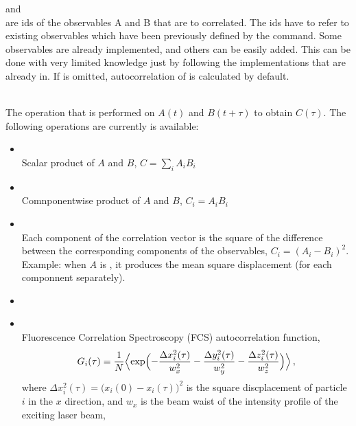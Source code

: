 \begin{arguments}
\item {} and  \\ 
  are ids of the observables A and B that are to correlated. The ids have to refer to existing 
  observables which have been previously defined by the  command.
  Some observables are already implemented, and others can be easily added. This can be done
  with very limited \es{} knowledge just by following the implementations that are already
  in. If  is omitted, autocorrelation of  is calculated by default.
\item {} \\
  The operation that is performed on $A(t)$ and $B(t+\tau)$ to obtain $C(\tau)$. 
  The following operations are currently is available:
  \begin{itemize}
    \item {} \\
    Scalar product of $A$ and $B$, \ie $C=\sum\limits_{i} A_i B_i$
    \item {} \\
    Comnponentwise product of $A$ and $B$, \ie $C_i = A_i B_i$
    \item {} \\
    Each component of the correlation vector is the square of the difference between the 
    corresponding components of the observables, \ie $C_i = (A_i-B_i)^2$. 
    Example: when $A$ is , it produces the mean square displacement
    (for each componnent separately).
    \item {}
    \item {}   \\
    Fluorescence Correlation Spectroscopy (FCS) autocorrelation function, \ie
    \begin{equation}
    G_i(\tau) = \frac{1}{N} \Bigl< \exp \Bigl( - \frac{\Delta x_i^2(\tau) }{w_x^2} - \frac{\Delta y_i^2(\tau)}{w_y^2} - \frac{\Delta z_i^2(\tau)}{w_z^2} \Bigr) \Bigr>\,,
    \label{eq:Gtau}
    \end{equation}
    where $\Delta x_i^2(\tau) = \bigl(x_i(0) - x_i(\tau) \bigr)^2$ is the square discplacement 
    of particle $i$ in the $x$ direction, and $w_x$ is the beam waist of the intensity profile 
    of the exciting laser beam,
    \begin{equation}

\end{equation}
\end{itemize}
\end{arguments}
